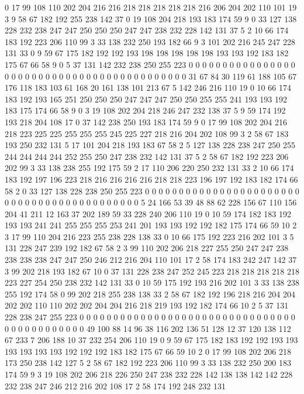 0 17 99 108 110 202 204 216 216 218 218 218 218 218 216 206 204 202 110 101
19 3 9 58 67 182 192 255 238 142 37 0 19 108 204 218 193 183 174 59
9 0 33 127 138 228 232 238 247 247 250 250 250 247 247 238 232 228 142 131
37 5 2 10 66 174 183 192 223 206 110 99 3 33 138 232 250 193 182 66
9 3 101 202 216 245 247 228 131 33 0 9 59 67 175 182 192 192 193 198
198 198 198 198 193 193 192 183 182 175 67 66 58 9 0 5 37 131 142 232
238 250 255 223 0 0 0 0 0 0 0 0 0 0 0 0 0 0 0 0
0 0 0 0 0 0 0 0 0 0 0 0 0 0 0 0 0 0 0 0
0 0 0 0 0 0 0 31 67 84 30 119 61 188 105 67 176 118 183 103
61 168 20 161 138 101 213 67 5 142 246 216 110 19 0 10 66 174 183 192
193 165 251 250 250 250 247 247 247 250 250 255 255 241 193 193 192 183 175 174
66 58 9 0 3 19 108 202 204 218 246 247 232 138 37 5 9 59 174 192
193 218 204 108 17 0 37 142 238 250 193 183 174 59 9 0 17 99 108 202
204 216 218 223 225 225 255 255 255 245 225 227 218 216 204 202 108 99 3 2
58 67 183 193 250 232 131 5 17 101 204 218 193 183 67 58 2 5 127 138
228 238 247 250 255 244 244 244 244 252 255 250 247 238 232 142 131 37 5 2
58 67 182 192 223 206 202 99 3 33 138 238 255 192 175 59 2 17 110 206
220 250 232 131 33 2 10 66 174 183 192 197 196 223 218 216 216 216 216 218
218 223 196 197 192 183 182 174 66 58 2 0 33 127 138 228 238 250 255 223
0 0 0 0 0 0 0 0 0 0 0 0 0 0 0 0 0 0 0 0
0 0 0 0 0 0 0 0 0 0 0 0 0 0 0 0 0 0 0 0
0 0 0 5 24 166 53 39 48 88 62 228 156 67 110 156 204 41 211 12
163 37 202 189 59 33 228 240 206 110 19 0 10 59 174 182 183 192 193 193
241 241 255 255 255 253 241 201 193 193 192 192 182 175 174 66 59 10 2 3
17 99 110 204 216 223 255 238 228 138 33 0 10 66 175 192 223 216 202 101
3 5 131 228 247 239 192 182 67 58 2 3 99 110 202 206 218 227 255 250
247 247 238 238 238 238 247 247 250 246 212 216 204 110 101 17 2 58 174 183
242 247 142 37 3 99 202 218 193 182 67 10 0 37 131 228 238 247 252 245
223 218 218 218 218 218 223 227 254 250 238 232 142 131 33 0 10 59 175 192
193 216 202 101 3 33 138 238 255 192 174 58 0 99 202 218 255 238 138 33
2 58 67 182 192 196 218 216 204 204 202 202 110 110 202 202 204 204 216 218
219 193 192 182 174 66 10 2 5 37 131 228 238 247 255 223 0 0 0 0
0 0 0 0 0 0 0 0 0 0 0 0 0 0 0 0 0 0 0 0
0 0 0 0 0 0 0 0 0 0 0 0 0 0 0 0 0 0 0 0
49 100 88 14 96 38 116 202 136 51 128 12 37 120 138 112 67 233 7 206
188 10 37 232 254 206 110 19 0 9 59 67 175 182 183 192 192 193 193 193
193 193 193 192 192 192 183 182 175 67 66 59 10 2 0 17 99 108 202 206
218 173 250 238 142 127 5 2 58 67 182 192 223 206 110 99 3 33 138 232
250 200 183 174 59 9 3 19 108 202 206 218 226 250 247 238 232 228 142 138
138 142 142 228 232 238 247 246 212 216 202 108 17 2 58 174 192 248 232 131
